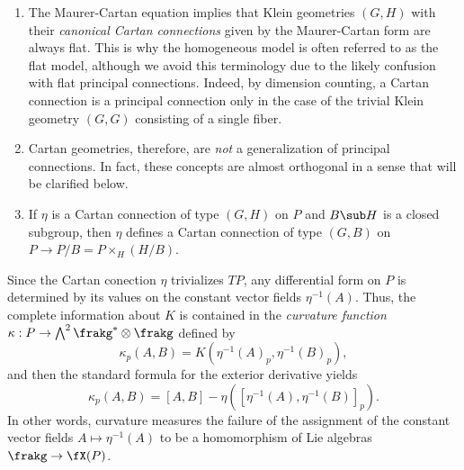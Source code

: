 \begin{example}
    \begin{enumerate}
        \item The Maurer-Cartan equation implies that Klein geometries $(G,H)$ with their \emph{canonical Cartan connections} given by the Maurer-Cartan form are always flat. This is why the homogeneous model is often referred to as the flat model, although we avoid this terminology due to the likely confusion with flat principal connections. Indeed, by dimension counting, a Cartan connection is a principal connection only in the case of the trivial Klein geometry $(G,G)$ consisting of a single fiber.
        \item Cartan geometries, therefore, are \emph{not} a generalization of principal connections. In fact, these concepts are almost orthogonal in a sense that will be clarified below.
        \item If $\eta$ is a Cartan connection of type $(G,H)$ on $P$ and $B\sub H$ is a closed subgroup, then $\eta$ defines a Cartan connection of type $(G,B)$ on $P\to P\slash B= P\times_H (H\slash B)$.\label{xca V.3.6 Sharpe}
    \end{enumerate}
\end{example}



Since the Cartan conection $\eta$ trivializes $TP$, any differential form on $P$ is determined by its values on the constant vector fields $\eta^{-1}(A)$. Thus, the complete information about $K$ is contained in the \emph{curvature function} $\kappa:P\to \bigwedge^2\frakg^\ast\otimes\frakg$ defined by 
\[\kappa_p(A,B)=K\left(\eta^{-1}(A)_p,\eta^{-1}(B)_p\right),\]
and then the standard formula for the exterior derivative yields 
\[\kappa_p(A,B)=[A,B]-\eta\left(\left[\eta^{-1}(A),\eta^{-1}(B)\right]_p\right).\]
In other words, curvature measures the failure of the assignment of the constant vector fields $A\mapsto \eta^{-1}(A)$ to be a homomorphism of Lie algebras $\frakg\to \fX(P)$.

